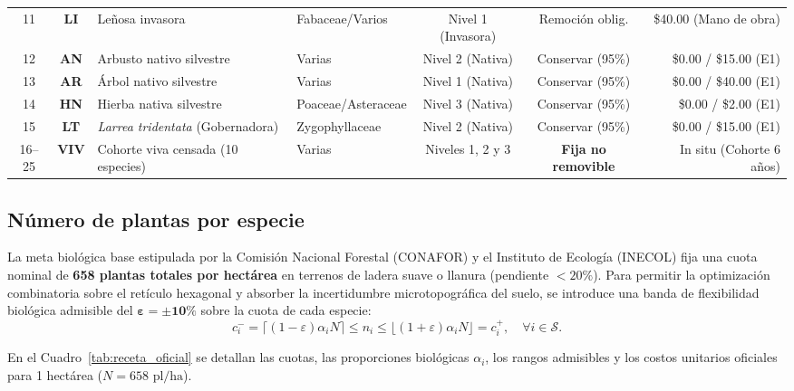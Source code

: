 \documentclass[11pt,a4paper]{article}
\begin{document}
\begin{table}[H]
{\begin{tabular}{ccllccr}
11 & \textbf{LI} & Leñosa invasora & Fabaceae/Varios & Nivel 1 (Invasora) & Remoción oblig. & \$40.00 (Mano de obra) \\
12 & \textbf{AN} & Arbusto nativo silvestre & Varias & Nivel 2 (Nativa) & Conservar (95\%) & \$0.00 / \$15.00 (E1) \\
13 & \textbf{AR} & Árbol nativo silvestre & Varias & Nivel 1 (Nativa) & Conservar (95\%) & \$0.00 / \$40.00 (E1) \\
14 & \textbf{HN} & Hierba nativa silvestre & Poaceae/Asteraceae & Nivel 3 (Nativa) & Conservar (95\%) & \$0.00 / \$2.00 (E1) \\
15 & \textbf{LT} & \textit{Larrea tridentata} (Gobernadora) & Zygophyllaceae & Nivel 2 (Nativa) & Conservar (95\%) & \$0.00 / \$15.00 (E1) \\
\midrule
16--25 & \textbf{VIV} & Cohorte viva censada (10 especies) & Varias & Niveles 1, 2 y 3 & \textbf{Fija no removible} & In situ (Cohorte 6 años) \\
\bottomrule
\end{tabular}}
\end{table}

\subsection{Número de plantas por especie}
La meta biológica base estipulada por la Comisión Nacional Forestal (CONAFOR) y el Instituto de Ecología (INECOL) fija una cuota nominal de \textbf{658 plantas totales por hectárea} en terrenos de ladera suave o llanura (pendiente $< 20\%$). Para permitir la optimización combinatoria sobre el retículo hexagonal y absorber la incertidumbre microtopográfica del suelo, se introduce una banda de flexibilidad biológica admisible del $\boldsymbol{\varepsilon = \pm 10\%}$ sobre la cuota de cada especie:
\begin{equation}
c_i^- = \lceil (1 - \varepsilon)\alpha_i N \rceil \le n_i \le \lfloor (1 + \varepsilon)\alpha_i N \rfloor = c_i^+, \quad \forall i \in \mathcal{S}.
\end{equation}

En el Cuadro~\ref{tab:receta_oficial} se detallan las cuotas, las proporciones biológicas $\alpha_i$, los rangos admisibles y los costos unitarios oficiales para 1 hectárea ($N = 658\text{ pl/ha}$).
\end{document}
